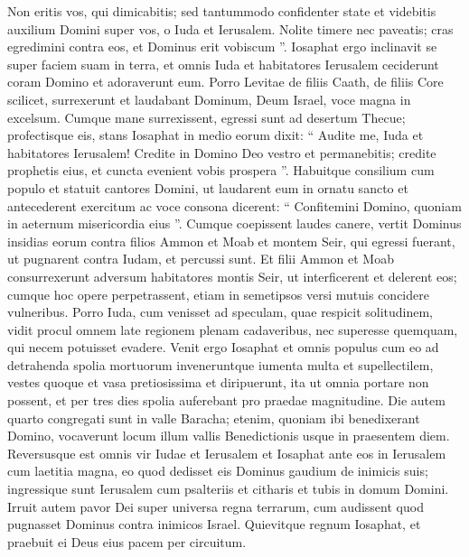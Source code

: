 \begin{biblechapter}
\begin{biblechapter}
\begin{biblechapter}
\begin{biblechapter}
\begin{biblechapter}
\begin{biblechapter}
\begin{biblechapter}
\begin{biblechapter}
\begin{biblechapter}
\begin{biblechapter}
\begin{biblechapter}
\begin{biblechapter}
\begin{biblechapter}
\begin{biblechapter}
\begin{biblechapter}
\begin{biblechapter}
\begin{biblechapter}
\begin{biblechapter}
\begin{biblechapter}
\begin{biblechapter}
 \verse Non eritis vos, qui dimicabitis; sed tantummodo confidenter state et videbitis auxilium Domini super vos, o Iuda et Ierusalem. Nolite timere nec paveatis; cras egredimini contra eos, et Dominus erit vobiscum ”. 
\verse Iosaphat ergo inclinavit se super faciem suam in terra, et omnis Iuda et habitatores Ierusalem ceciderunt coram Domino et adoraverunt eum. 
\verse Porro Levitae de filiis Caath, de filiis Core scilicet, surrexerunt et laudabant Dominum, Deum Israel, voce magna in excelsum.
 \verse Cumque mane surrexissent, egressi sunt ad desertum Thecue; profectisque eis, stans Iosaphat in medio eorum dixit: “ Audite me, Iuda et habitatores Ierusalem! Credite in Domino Deo vestro et permanebitis; credite prophetis eius, et cuncta evenient vobis prospera ”. 
\verse Habuitque consilium cum populo et statuit cantores Domini, ut laudarent eum in ornatu sancto et antecederent exercitum ac voce consona dicerent: “ Confitemini Domino, quoniam in aeternum misericordia eius ”.
 \verse Cumque coepissent laudes canere, vertit Dominus insidias eorum contra filios Ammon et Moab et montem Seir, qui egressi fuerant, ut pugnarent contra Iudam, et percussi sunt. 
\verse Et filii Ammon et Moab consurrexerunt adversum habitatores montis Seir, ut interficerent et delerent eos; cumque hoc opere perpetrassent, etiam in semetipsos versi mutuis concidere vulneribus.
 \verse Porro Iuda, cum venisset ad speculam, quae respicit solitudinem, vidit procul omnem late regionem plenam cadaveribus, nec superesse quemquam, qui necem potuisset evadere. 
\verse Venit ergo Iosaphat et omnis populus cum eo ad detrahenda spolia mortuorum inveneruntque iumenta multa et supellectilem, vestes quoque et vasa pretiosissima et diripuerunt, ita ut omnia portare non possent, et per tres dies spolia auferebant pro praedae magnitudine. 
\verse Die autem quarto congregati sunt in valle Baracha; etenim, quoniam ibi benedixerant Domino, vocaverunt locum illum vallis Benedictionis usque in praesentem diem. 
 \verse Reversusque est omnis vir Iudae et Ierusalem et Iosaphat ante eos in Ierusalem cum laetitia magna, eo quod dedisset eis Dominus gaudium de inimicis suis; 
\verse ingressique sunt Ierusalem cum psalteriis et citharis et tubis in domum Domini. 
\verse Irruit autem pavor Dei super universa regna terrarum, cum audissent quod pugnasset Dominus contra inimicos Israel. 
\verse Quievitque regnum Iosaphat, et praebuit ei Deus eius pacem per circuitum.

\end{biblechapter}
\end{biblechapter}
\end{biblechapter}
\end{biblechapter}
\end{biblechapter}
\end{biblechapter}
\end{biblechapter}
\end{biblechapter}
\end{biblechapter}
\end{biblechapter}
\end{biblechapter}
\end{biblechapter}
\end{biblechapter}
\end{biblechapter}
\end{biblechapter}
\end{biblechapter}
\end{biblechapter}
\end{biblechapter}
\end{biblechapter}
\end{biblechapter}
